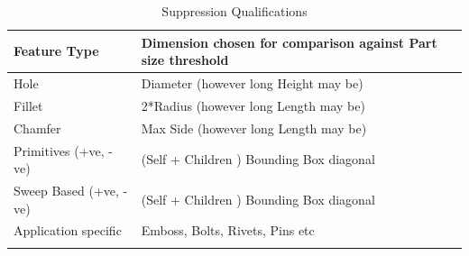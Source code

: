 \begin{longtable}{L{0.45\textwidth}  L{0.55\textwidth}}
\caption{Suppression Qualifications}\\
\hline
{\bf Feature Type} & {\bf Dimension chosen for comparison against Part size threshold} \\
\hline
\hline
Hole &
Diameter (however long Height may be) \\


Fillet &
2*Radius (however long Length may be) \\


Chamfer &
Max Side (however long Length may be) \\


Primitives (+ve, -ve) &
(Self + Children ) Bounding Box diagonal \\

Sweep Based (+ve, -ve) &
(Self + Children ) Bounding Box diagonal\\


Application specific &
Emboss, Bolts, Rivets, Pins etc\\
\hline

\label{DefeatRules}
\end{longtable}



